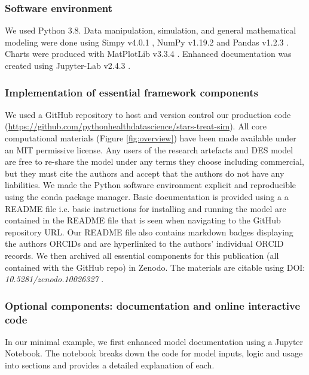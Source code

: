 \documentclass[]{interact}
\theoremstyle{plain}%
\theoremstyle{definition}
\theoremstyle{remark}
\begin{document}
\subsubsection{Software environment}

We used Python 3.8. Data manipulation, simulation, and general mathematical modeling were done using Simpy v4.0.1 \citep{simpy}, NumPy v1.19.2 \citep{numpy} and Pandas v1.2.3 \citep{mckinney2011pandas}. Charts were produced with MatPlotLib v3.3.4 \citep{Hunter:2007}. Enhanced documentation was created using Jupyter-Lab v2.4.3 \citep{jupyterlab_jupyterlab_2022}.

\subsubsection{Implementation of essential framework components}

We used a GitHub repository to host and version control our production code (\url{https://github.com/pythonhealthdatascience/stars-treat-sim}). All core computational materials  (Figure \ref{fig:overview})  have been made available under an MIT permissive license.  Any users of the research artefacts and DES model are free to re-share the model under any terms they choose including commercial, but they must cite the authors and accept that the authors do not have any liabilities. We made the Python software environment explicit and reproducible using the conda package manager. Basic documentation is provided using a a README file i.e. basic instructions for installing and running the model are contained in the README file that is seen when navigating to the GitHub repository URL.  Our README file also contains markdown badges displaying the authors ORCIDs and are hyperlinked to the authors' individual ORCID records. We then archived all essential components for this publication (all contained with the GitHub repo) in Zenodo. The materials are citable using DOI: \textit{10.5281/zenodo.10026327} \citep{applied_example1}.

\subsubsection{Optional components: documentation and online interactive code}

In our minimal example, we first enhanced model documentation using a Jupyter Notebook.  The notebook breaks down the code for model inputs, logic and usage into sections and provides a detailed explanation of each.  
\end{document}
